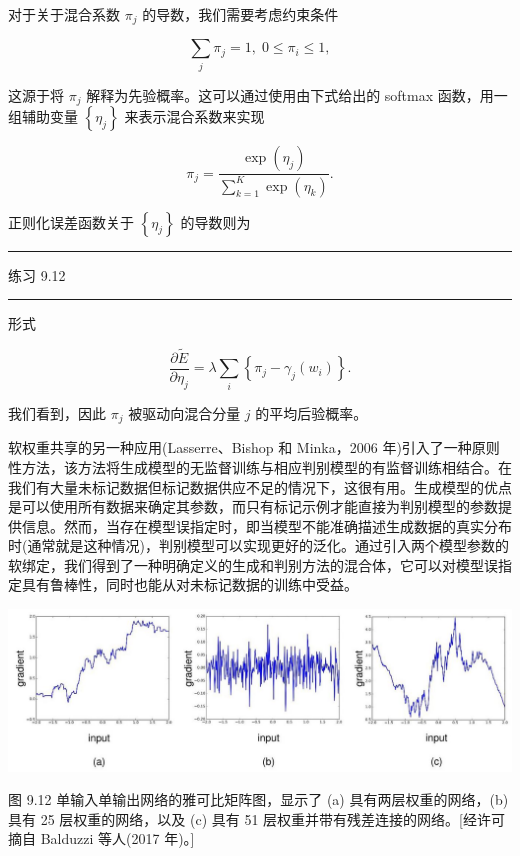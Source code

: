 \documentclass[10pt]{report}
\newcommand{\HRule}{\begin{center}\rule{0.9\linewidth}{0.2mm}\end{center}}
\begin{document}
对于关于混合系数 \({\pi }_{j}\) 的导数，我们需要考虑约束条件

\[
\mathop{\sum }\limits_{j}{\pi }_{j} = 1,\;0 \leq  {\pi }_{i} \leq  1, \tag{9.29}
\]

这源于将 \({\pi }_{j}\) 解释为先验概率。这可以通过使用由下式给出的 softmax 函数，用一组辅助变量 \(\left\{  {\eta }_{j}\right\}\) 来表示混合系数来实现

\[
{\pi }_{j} = \frac{\exp \left( {\eta }_{j}\right) }{\mathop{\sum }\limits_{{k = 1}}^{K}\exp \left( {\eta }_{k}\right) }. \tag{9.30}
\]

正则化误差函数关于 \(\left\{  {\eta }_{j}\right\}\) 的导数则为

\HRule

练习 9.12

\HRule

形式

\[
\frac{\partial \widetilde{E}}{\partial {\eta }_{j}} = \lambda \mathop{\sum }\limits_{i}\left\{  {{\pi }_{j} - {\gamma }_{j}\left( {w}_{i}\right) }\right\}  . \tag{9.31}
\]

我们看到，因此 \({\pi }_{j}\) 被驱动向混合分量 \(j\) 的平均后验概率。

软权重共享的另一种应用(Lasserre、Bishop 和 Minka，2006 年)引入了一种原则性方法，该方法将生成模型的无监督训练与相应判别模型的有监督训练相结合。在我们有大量未标记数据但标记数据供应不足的情况下，这很有用。生成模型的优点是可以使用所有数据来确定其参数，而只有标记示例才能直接为判别模型的参数提供信息。然而，当存在模型误指定时，即当模型不能准确描述生成数据的真实分布时(通常就是这种情况)，判别模型可以实现更好的泛化。通过引入两个模型参数的软绑定，我们得到了一种明确定义的生成和判别方法的混合体，它可以对模型误指定具有鲁棒性，同时也能从对未标记数据的训练中受益。

\begin{center}
\includegraphics[max width=1.0\textwidth]{images/0194e279-9b28-703a-88f4-c3ac21e2010d_293_214_355_1359_438_0.jpg}
\end{center}
\hspace*{3em} 

图 9.12 单输入单输出网络的雅可比矩阵图，显示了 (a) 具有两层权重的网络，(b) 具有 25 层权重的网络，以及 (c) 具有 51 层权重并带有残差连接的网络。[经许可摘自 Balduzzi 等人(2017 年)。]
\end{document}
